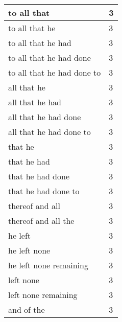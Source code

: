 \begin{center}
\begin{longtable}{|p{3.0in}|p{0.5in}|}
to all that & 3\\ \hline 
to all that he & 3\\ \hline 
to all that he had & 3\\ \hline 
to all that he had done & 3\\ \hline 
to all that he had done to & 3\\ \hline 
all that he & 3\\ \hline 
all that he had & 3\\ \hline 
all that he had done & 3\\ \hline 
all that he had done to & 3\\ \hline 
that he & 3\\ \hline 
that he had & 3\\ \hline 
that he had done & 3\\ \hline 
that he had done to & 3\\ \hline 
thereof and all & 3\\ \hline 
thereof and all the & 3\\ \hline 
he left & 3\\ \hline 
he left none & 3\\ \hline 
he left none remaining & 3\\ \hline 
left none & 3\\ \hline 
left none remaining & 3\\ \hline 
and of the & 3\\ \hline 
\end{longtable}
\end{center}





